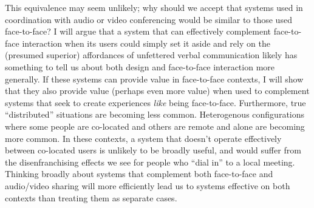This equivalence may seem unlikely; why should we accept that systems used in coordination with audio or video conferencing would be similar to those used face-to-face? I will argue that a system that can effectively complement face-to-face interaction when its users could simply set it aside and rely on the (presumed superior) affordances of unfettered verbal communication likely has something to tell us about both design and face-to-face interaction more generally. If these systems can provide value in face-to-face contexts, I will show that they also provide value (perhaps even more value) when used to complement systems that seek to create experiences \emph{like} being face-to-face. Furthermore, true ``distributed'' situations are becoming less common. Heterogenous configurations where some people are co-located and others are remote and alone are becoming more common. In these contexts, a system that doesn't operate effectively between co-located users is unlikely to be broadly useful, and would suffer from the disenfranchising effects we see for people who ``dial in'' to a local meeting. \cite{find_a_citation_for_this} Thinking broadly about systems that complement both face-to-face and audio/video sharing will more efficiently lead us to systems effective on both contexts than treating them as separate cases.






